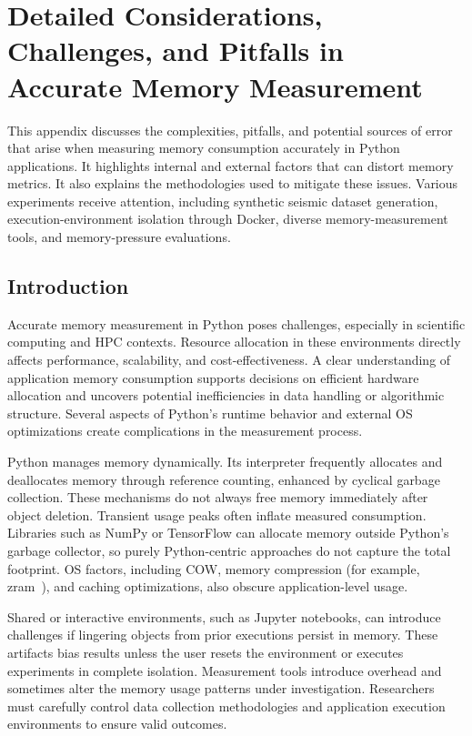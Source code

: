 \chapter{Detailed Considerations, Challenges, and Pitfalls in Accurate Memory Measurement}
\label{ch:appendix-challenges-pitfalls}

This appendix discusses the complexities, pitfalls, and potential sources of error that arise when measuring memory consumption accurately in Python applications.
It highlights internal and external factors that can distort memory metrics.
It also explains the methodologies used to mitigate these issues.
Various experiments receive attention, including synthetic seismic dataset generation, execution-environment isolation through Docker, diverse memory-measurement tools, and memory-pressure evaluations.


\section{Introduction}
\label{sec:appendix-introduction}

Accurate memory measurement in Python poses challenges, especially in scientific computing and \ac{HPC} contexts.
Resource allocation in these environments directly affects performance, scalability, and cost-effectiveness.
A clear understanding of application memory consumption supports decisions on efficient hardware allocation and uncovers potential inefficiencies in data handling or algorithmic structure.
Several aspects of Python's runtime behavior and external \ac{OS} optimizations create complications in the measurement process.

Python manages memory dynamically.
Its interpreter frequently allocates and deallocates memory through reference counting, enhanced by cyclical garbage collection.
These mechanisms do not always free memory immediately after object deletion.
Transient usage peaks often inflate measured consumption.
Libraries such as NumPy or TensorFlow can allocate memory outside Python's garbage collector, so purely Python-centric approaches do not capture the total footprint.
\ac{OS} factors, including \ac{COW}, memory compression (for example, zram~\cite{zram}), and caching optimizations, also obscure application-level usage.

Shared or interactive environments, such as Jupyter notebooks, can introduce challenges if lingering objects from prior executions persist in memory.
These artifacts bias results unless the user resets the environment or executes experiments in complete isolation.
Measurement tools introduce overhead and sometimes alter the memory usage patterns under investigation.
Researchers must carefully control data collection methodologies and application execution environments to ensure valid outcomes.


